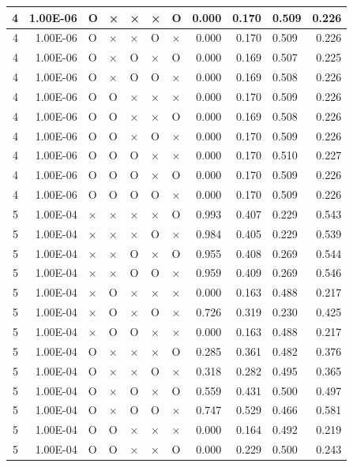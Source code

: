 \documentclass[11pt]{article}
\begin{document}
\begin{longtable}[h]{|r|r|l|l|l|l|l|r|r|l|r|}
4 & 1.00E-06 & O & × & × & × & O & 0.000 & 0.170 & 0.509 & 0.226 \\ \hline
4 & 1.00E-06 & O & × & × & O & × & 0.000 & 0.170 & 0.509 & 0.226 \\ \hline
4 & 1.00E-06 & O & × & O & × & O & 0.000 & 0.169 & 0.507 & 0.225 \\ \hline
4 & 1.00E-06 & O & × & O & O & × & 0.000 & 0.169 & 0.508 & 0.226 \\ \hline
4 & 1.00E-06 & O & O & × & × & × & 0.000 & 0.170 & 0.509 & 0.226 \\ \hline
4 & 1.00E-06 & O & O & × & × & O & 0.000 & 0.169 & 0.508 & 0.226 \\ \hline
4 & 1.00E-06 & O & O & × & O & × & 0.000 & 0.170 & 0.509 & 0.226 \\ \hline
4 & 1.00E-06 & O & O & O & × & × & 0.000 & 0.170 & 0.510 & 0.227 \\ \hline
4 & 1.00E-06 & O & O & O & × & O & 0.000 & 0.170 & 0.509 & 0.226 \\ \hline
4 & 1.00E-06 & O & O & O & O & × & 0.000 & 0.170 & 0.509 & 0.226 \\ \hline
5 & 1.00E-04 & × & × & × & × & O & 0.993 & 0.407 & 0.229 & 0.543 \\ \hline
5 & 1.00E-04 & × & × & × & O & × & 0.984 & 0.405 & 0.229 & 0.539 \\ \hline
5 & 1.00E-04 & × & × & O & × & O & 0.955 & 0.408 & 0.269 & 0.544 \\ \hline
5 & 1.00E-04 & × & × & O & O & × & 0.959 & 0.409 & 0.269 & 0.546 \\ \hline
5 & 1.00E-04 & × & O & × & × & × & 0.000 & 0.163 & 0.488 & 0.217 \\ \hline
5 & 1.00E-04 & × & O & × & O & × & 0.726 & 0.319 & 0.230 & 0.425 \\ \hline
5 & 1.00E-04 & × & O & O & × & × & 0.000 & 0.163 & 0.488 & 0.217 \\ \hline
5 & 1.00E-04 & O & × & × & × & O & 0.285 & 0.361 & 0.482 & 0.376 \\ \hline
5 & 1.00E-04 & O & × & × & O & × & 0.318 & 0.282 & 0.495 & 0.365 \\ \hline
5 & 1.00E-04 & O & × & O & × & O & 0.559 & 0.431 & 0.500 & 0.497 \\ \hline
5 & 1.00E-04 & O & × & O & O & × & 0.747 & 0.529 & 0.466 & 0.581 \\ \hline
5 & 1.00E-04 & O & O & × & × & × & 0.000 & 0.164 & 0.492 & 0.219 \\ \hline
5 & 1.00E-04 & O & O & × & × & O & 0.000 & 0.229 & 0.500 & 0.243 \\ \hline

\end{longtable}
\end{document}
